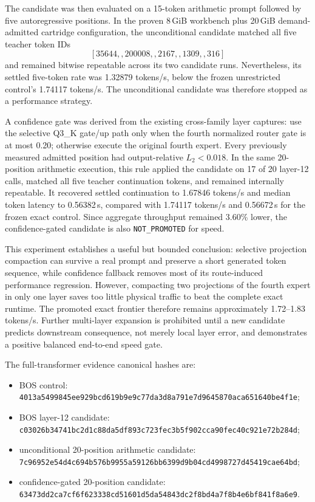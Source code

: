 The candidate was then evaluated on a 15-token arithmetic prompt followed by
five autoregressive positions.  In the proven 8\,GiB workbench plus 20\,GiB
demand-admitted cartridge configuration, the unconditional candidate matched
all five teacher token IDs
\[
  [35644,,200008,,2167,,1309,,316]
\]
and remained bitwise repeatable across its two candidate runs.  Nevertheless,
its settled five-token rate was 1.32879 tokens/s, below the frozen unrestricted
control's 1.74117 tokens/s.  The unconditional candidate was therefore stopped
as a performance strategy.

A confidence gate was derived from the existing cross-family layer captures:
use the selective Q3\_K gate/up path only when the fourth normalized router
gate is at most 0.20; otherwise execute the original fourth expert.  Every
previously measured admitted position had output-relative $L_2<0.018$.  In the
same 20-position arithmetic execution, this rule applied the candidate on 17
of 20 layer-12 calls, matched all five teacher continuation tokens, and remained
internally repeatable.  It recovered settled continuation to 1.67846 tokens/s
and median token latency to 0.56382\,s, compared with 1.74117 tokens/s and
0.56672\,s for the frozen exact control.  Since aggregate throughput remained
3.60\% lower, the confidence-gated candidate is also
\texttt{NOT\_PROMOTED} for speed.

This experiment establishes a useful but bounded conclusion: selective
projection compaction can survive a real prompt and preserve a short generated
token sequence, while confidence fallback removes most of its route-induced
performance regression.  However, compacting two projections of the fourth
expert in only one layer saves too little physical traffic to beat the complete
exact runtime.  The promoted exact frontier therefore remains approximately
1.72--1.83 tokens/s.  Further multi-layer expansion is prohibited until a new
candidate predicts downstream consequence, not merely local layer error, and
demonstrates a positive balanced end-to-end speed gate.

The full-transformer evidence canonical hashes are:
\begin{itemize}
  \item BOS control: \texttt{4013a5499845ee929bcd619b9e9c77da3d8a791e7d9645870aca651640be4f1e};
  \item BOS layer-12 candidate: \texttt{c03026b34741bc2d1c88da5df893c723fec3b5f902cca90fec40c921e72b284d};
  \item unconditional 20-position arithmetic candidate: \texttt{7c96952e54d4c694b576b9955a59126bb6399d9b04cd4998727d45419cae64bd};
  \item confidence-gated 20-position candidate: \texttt{63473dd2ca7cf6f623338cd51601d5da54843dc2f8bd4a7f8b4e6bf841f8a6e9}.
\end{itemize}

